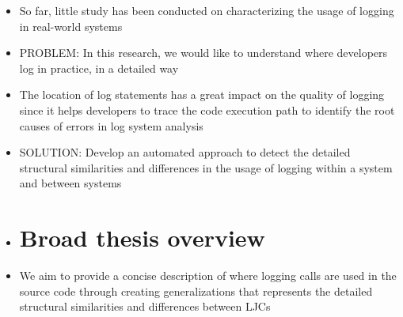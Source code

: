 \begin{itemize} [leftmargin=.01in]
\item So far, little study has been conducted on characterizing the usage of logging in real-world systems%

\item \textsc{PROBLEM: }In this research, we would like to understand
where developers log in practice, in a detailed way

\item The location of log statements has a great impact on the quality of logging since it helps developers to trace the code execution path to identify the root causes of errors in log system analysis
\item \textsc{SOLUTION: }Develop an automated approach to detect the detailed structural similarities and differences in the usage of logging within a system and between systems

\item {}  
\section{Broad thesis overview} \label{intro-overview}
\item We aim to provide a concise description of where logging calls are used in the source code through creating generalizations that represents the detailed structural similarities and differences between LJCs


\end{itemize}
